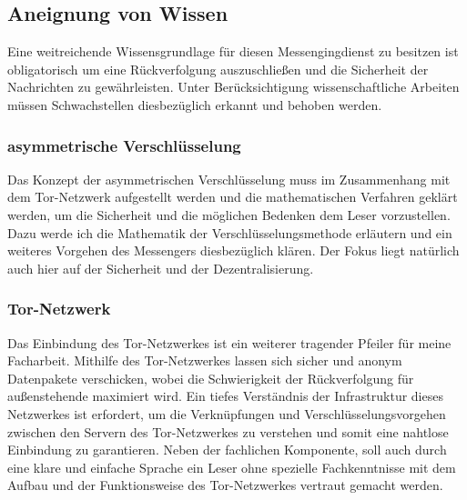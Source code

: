 \documentclass[a4paper,10pt,ngerman,
  headheight=28pt,]{scrartcl}
\begin{document}
\subsection{Aneignung von Wissen}
Eine weitreichende Wissensgrundlage für diesen Messengingdienst zu besitzen ist obligatorisch um eine Rückverfolgung auszuschließen und die Sicherheit der Nachrichten zu gewährleisten. Unter Berücksichtigung wissenschaftliche Arbeiten  müssen Schwachstellen diesbezüglich erkannt und behoben werden.

\subsubsection{asymmetrische Verschlüsselung}
Das Konzept der asymmetrischen Verschlüsselung muss im Zusammenhang mit dem Tor-Netzwerk aufgestellt werden und die mathematischen Verfahren geklärt werden, um die Sicherheit und die möglichen Bedenken dem Leser vorzustellen. Dazu werde ich die Mathematik der Verschlüsselungsmethode erläutern und ein weiteres Vorgehen des Messengers diesbezüglich klären. Der Fokus liegt natürlich auch hier auf der Sicherheit und der Dezentralisierung.

\subsubsection{Tor-Netzwerk}
Das Einbindung des Tor-Netzwerkes ist ein weiterer tragender Pfeiler für meine Facharbeit. Mithilfe des Tor-Netzwerkes lassen sich sicher und anonym Datenpakete verschicken, wobei die Schwierigkeit der Rückverfolgung für außenstehende maximiert wird. Ein tiefes Verständnis der Infrastruktur dieses Netzwerkes ist erfordert, um die Verknüpfungen und Verschlüsselungsvorgehen zwischen den Servern des Tor-Netzwerkes zu verstehen und somit eine nahtlose Einbindung zu garantieren. Neben der fachlichen Komponente, soll auch durch eine klare und einfache Sprache ein Leser ohne spezielle Fachkenntnisse mit dem Aufbau und der Funktionsweise des Tor-Netzwerkes vertraut gemacht werden.
\end{document}
